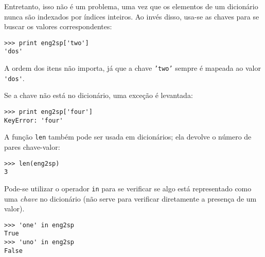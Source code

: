Entretanto, isso não é um problema, uma vez que os elementos de um dicionário
nunca são indexados por índices inteiros. Ao invés disso, usa-se as chaves para
se buscar os valores correspondentes:

\beforeverb
\begin{verbatim}
>>> print eng2sp['two']
'dos'
\end{verbatim}
\afterverb
%

A ordem dos itens não importa, já que a chave {\tt 'two'} sempre é mapeada ao valor \verb"'dos'".

Se a chave não está no dicionário, uma exceção é levantada:


\beforeverb
\begin{verbatim}
>>> print eng2sp['four']
KeyError: 'four'
\end{verbatim}
\afterverb
%

A função {\tt len} também pode ser usada em dicionários; ela devolve
o número de pares chave-valor:


\beforeverb
\begin{verbatim}
>>> len(eng2sp)
3
\end{verbatim}
\afterverb
%

Pode-se utilizar o operador {\tt in} para se verificar se algo está representado
como uma \emph{chave} no dicionário (não serve para verificar diretamente
a presença de um valor).


\beforeverb
\begin{verbatim}
>>> 'one' in eng2sp
True
>>> 'uno' in eng2sp
False
\end{verbatim}
\afterverb
%

